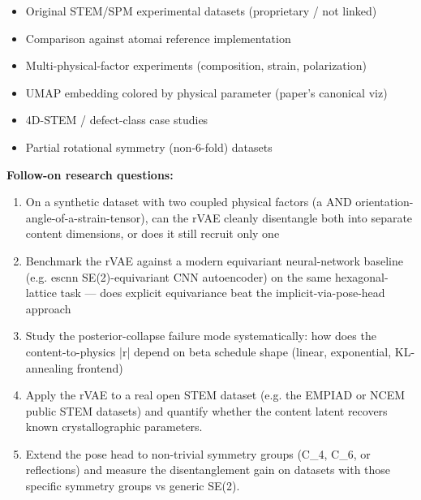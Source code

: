 \begin{itemize}[leftmargin=1.4em,itemsep=0.2em,topsep=0.2em]
\item Original STEM/SPM experimental datasets (proprietary / not linked)
\item Comparison against atomai reference implementation
\item Multi-physical-factor experiments (composition, strain, polarization)
\item UMAP embedding colored by physical parameter (paper's canonical viz)
\item 4D-STEM / defect-class case studies
\item Partial rotational symmetry (non-6-fold) datasets
\end{itemize}\noindent\textbf{Follow-on research questions:}
\begin{enumerate}[leftmargin=1.6em,itemsep=0.2em,topsep=0.2em,label=Q\arabic*.]
\item On a synthetic dataset with two coupled physical factors (a AND orientation-angle-of-a-strain-tensor), can the rVAE cleanly disentangle both into separate content dimensions, or does it still recruit only one
\item Benchmark the rVAE against a modern equivariant neural-network baseline (e.g. escnn SE(2)-equivariant CNN autoencoder) on the same hexagonal-lattice task --- does explicit equivariance beat the implicit-via-pose-head approach
\item Study the posterior-collapse failure mode systematically: how does the content-to-physics |r| depend on beta schedule shape (linear, exponential, KL-annealing frontend)
\item Apply the rVAE to a real open STEM dataset (e.g. the EMPIAD or NCEM public STEM datasets) and quantify whether the content latent recovers known crystallographic parameters.
\item Extend the pose head to non-trivial symmetry groups (C\_4, C\_6, or reflections) and measure the disentanglement gain on datasets with those specific symmetry groups vs generic SE(2).
\end{enumerate}

